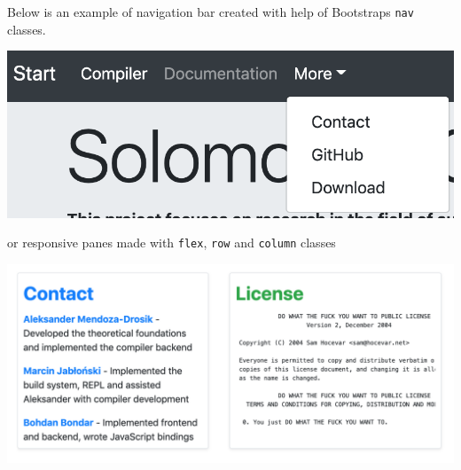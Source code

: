 Below is an example of navigation bar created with help of Bootstraps \texttt{nav} classes.
\begin{center}
	\includegraphics[scale=0.7]{navbar.png}
\end{center}
or responsive panes made with \texttt{flex}, \texttt{row} and \texttt{column} classes
\begin{center}
	\includegraphics[scale=0.4]{panes.png}
\end{center}

